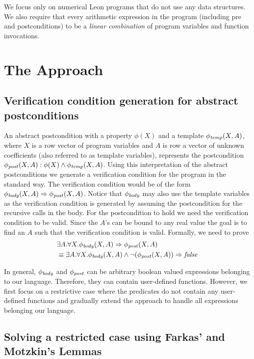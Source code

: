 \documentclass[a4paper,10pt]{article}
\begin{document}
We focus only on numerical Leon programs that do not use any data structures. We also require that every arithmetic expression in the program (including pre and postconditions) to be a \emph{linear combination} of program variables and function invocations.

\section{The Approach}


\subsection{Verification condition generation for abstract postconditions}

An abstract postcondition with a property $\phi(X)$ and a template $\mathit{\phi_{temp}}(X,A)$,
where $X$ is a row vector of program variables and $A$ is row a vector of unknown coefficients (also referred to as template variables),
represents the postcondition $\mathit{\phi_{post}}(X,A): \phi(X) \wedge \mathit{\phi_{temp}}(X,A)$.
Using this interpretation of the abstract postconditions we generate a verification condition 
for the program in the standard way. 
The verification condition would be of the form $\mathit{\phi_{body}}(X,A) \Rightarrow \mathit{\phi_{post}}(X,A)$. Notice that $\mathit{\phi_{body}}$ may also use the template variables as the verification condition is generated by assuming the postcondition for the recursive calls in the body.
For the postcondition to hold we need the verification condition to be valid. Since the $A$'s can be bound to any real value the goal is to find an $A$ such that the verification condition is valid. Formally, we need to prove
%
\begin{align}
& \exists A. \forall X. \mathit{\phi_{body}}(X,A) \Rightarrow \mathit{\phi_{post}}(X,A) \\
& \equiv  \exists A. \forall X. \mathit{\phi_{body}}(X,A) \wedge \neg(\mathit{\phi_{post}}(X,A)) \Rightarrow \mathit{false}
\label{eq:tempvc}
\end{align}

In general, $\mathit{\phi_{body}}$ and $\mathit{\phi_{post}}$ can be arbitrary boolean valued expressions belonging to our language. Therefore, they can contain user-defined functions.
However, we first focus on a restrictive case where the predicates do not contain any user-defined functions and gradually extend the approach to handle all expressions belonging our language.

\subsection{Solving a restricted case using Farkas' and Motzkin's Lemmas}
\end{document}

